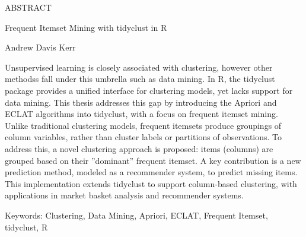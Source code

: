 \begin{center}
{{\MakeUppercase{Abstract}}\par
Frequent Itemset Mining with tidyclust in R\par
Andrew Davis Kerr\par
}
\end{center}

Unsupervised learning is closely associated with clustering, however other methodss
fall under this umbrella such as data mining. In R, the tidyclust package provides a 
unified interface for clustering models, yet lacks support for data mining. This 
thesis addresses this gap by introducing the Apriori and ECLAT algorithms into tidyclust, 
with a focus on frequent itemset mining. Unlike traditional clustering models, frequent 
itemsets produce groupings of column variables, rather than cluster labels or partitions 
of observations. To address this, a novel clustering approach is proposed: items (columns) 
are grouped based on their ”dominant” frequent itemset. A key contribution is a new
prediction method, modeled as a recommender system, to predict missing items. This 
implementation extends tidyclust to support column-based clustering, with applications 
in market basket analysis and recommender systems.

\par
\vspace*{\fill}
{Keywords}: Clustering, Data Mining, Apriori, ECLAT, Frequent Itemset, tidyclust, R
\vspace{0.5in}
\newpage